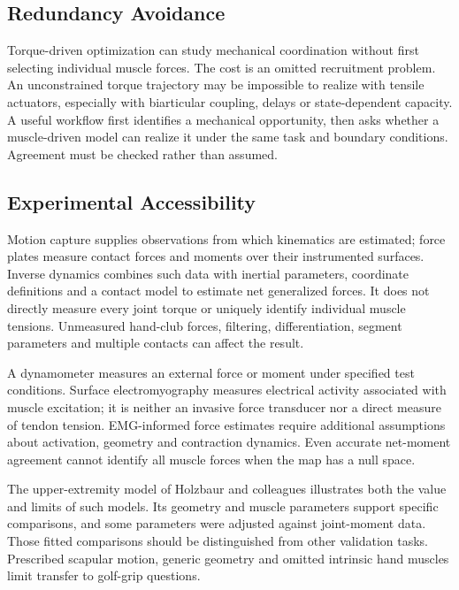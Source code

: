 \subsection{Redundancy Avoidance}

Torque-driven optimization can study mechanical coordination without first selecting individual muscle forces. The cost is an omitted recruitment problem. An unconstrained torque trajectory may be impossible to realize with tensile actuators, especially with biarticular coupling, delays or state-dependent capacity. A useful workflow first identifies a mechanical opportunity, then asks whether a muscle-driven model can realize it under the same task and boundary conditions. Agreement must be checked rather than assumed.

\subsection{Experimental Accessibility}

Motion capture supplies observations from which kinematics are estimated; force plates measure contact forces and moments over their instrumented surfaces. Inverse dynamics combines such data with inertial parameters, coordinate definitions and a contact model to estimate net generalized forces. It does not directly measure every joint torque or uniquely identify individual muscle tensions. Unmeasured hand-club forces, filtering, differentiation, segment parameters and multiple contacts can affect the result.

A dynamometer measures an external force or moment under specified test conditions. Surface electromyography measures electrical activity associated with muscle excitation; it is neither an invasive force transducer nor a direct measure of tendon tension. EMG-informed force estimates require additional assumptions about activation, geometry and contraction dynamics. Even accurate net-moment agreement cannot identify all muscle forces when the map has a null space.

The upper-extremity model of Holzbaur and colleagues illustrates both the value and limits of such models. Its geometry and muscle parameters support specific comparisons, and some parameters were adjusted against joint-moment data. Those fitted comparisons should be distinguished from other validation tasks. Prescribed scapular motion, generic geometry and omitted intrinsic hand muscles limit transfer to golf-grip questions. \citep{Holzbaur2005}

